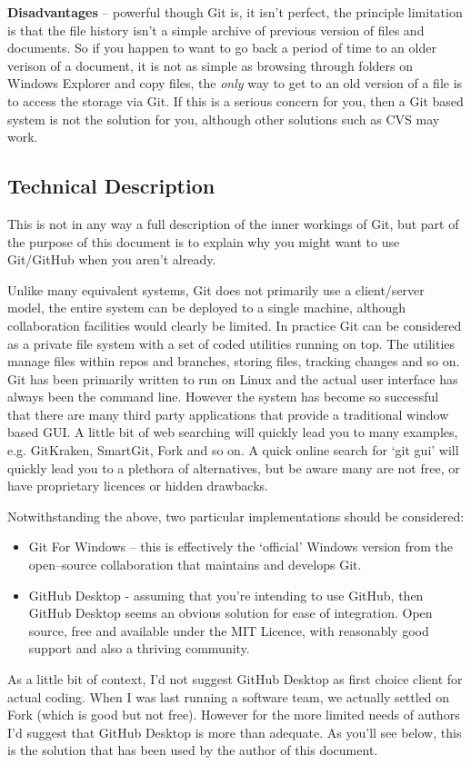 \documentclass[a4paper, 12pt]{article}
\begin{document}
\textbf{Disadvantages} -- powerful though Git is, it isn't perfect, the principle limitation is that the file history isn't a simple archive of previous version of files and documents. So if you happen to want to go back a period of time to an older verison of a document, it is not as simple as browsing through folders on Windows Explorer and copy files, the \textit{only} way to get to an old version of a file is to access the storage via Git. If this is a serious concern for you, then a Git based system is not the solution for you, although other solutions such as CVS may work.

\subsection{Technical Description}
This is not in any way a full description of the inner workings of Git, but part of the purpose of this document is to explain why you might want to use Git/GitHub when you aren't already.

Unlike many equivalent systems, Git does not primarily use a client/server model, the entire system can be deployed to a single machine, although collaboration facilities would clearly be limited. In practice Git can be considered as a private file system with a set of coded utilities running on top. The utilities manage files within repos and branches, storing files, tracking changes and so on. Git has been primarily written to run on Linux and the actual user interface has always been the command line. However the system has become so successful that there are many third party applications that provide a traditional window based GUI. A little bit of web searching will quickly lead you to many examples, e.g. GitKraken, SmartGit, Fork and so on. A quick online search for `git gui' will quickly lead you to a plethora of alternatives, but be aware many are not free, or have proprietary licences or hidden drawbacks.

Notwithstanding the above, two particular implementations should be considered:
\begin{itemize}
\item Git For Windows -- this is effectively the `official' Windows version from the open--source collaboration that maintains and develops Git.
\item GitHub Desktop - assuming that you're intending to use GitHub, then GitHub Desktop seems an obvious solution for ease of integration. Open source, free and available under the MIT Licence, with reasonably good support and also a thriving community.
\end{itemize}
As a little bit of context, I'd not suggest GitHub Desktop as first choice client for actual coding. When I was last running a software team, we actually settled on Fork (which is good but not free). However for the more limited needs of authors I'd suggest that GitHub Desktop is more than adequate. As you'll see below, this is the solution that has been used by the author of this document.
\end{document}
